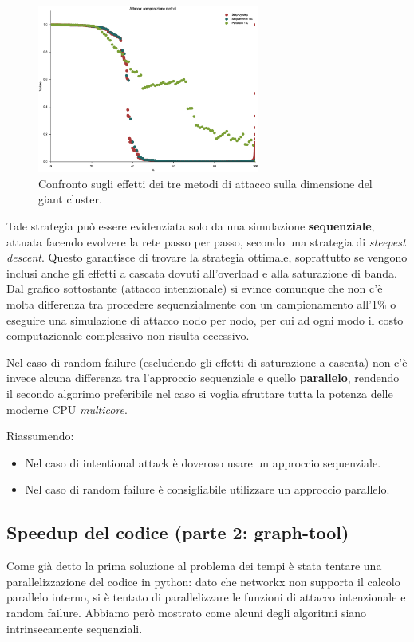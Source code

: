\begin{figure}[t!]
	\centering
	\includegraphics[width=0.65\textwidth]{./Immagini/Attack/AttackGC_Compare}
	\caption[Confronto metodi.]{Confronto sugli effetti dei tre metodi di attacco sulla dimensione del giant cluster.}
	\label{fig:compattack}
\end{figure}

Tale strategia può essere evidenziata solo da una simulazione \textbf{sequenziale}, attuata facendo evolvere la rete passo per passo, secondo una strategia di \emph{steepest descent}. Questo garantisce di trovare la strategia ottimale, soprattutto se vengono inclusi anche gli effetti a cascata dovuti all'overload e alla saturazione di banda. Dal grafico sottostante (attacco intenzionale) si evince comunque che non c'è molta differenza tra procedere sequenzialmente con un campionamento all'1\% o eseguire una simulazione di attacco nodo per nodo, per cui ad ogni modo il costo computazionale complessivo non risulta eccessivo.

Nel caso di random failure (escludendo gli effetti di saturazione a cascata) non c'è invece alcuna differenza tra l'approccio sequenziale e quello \textbf{parallelo}, rendendo il secondo algorimo preferibile nel caso si voglia sfruttare tutta la potenza delle moderne CPU \emph{multicore}.

Riassumendo: 
\begin{itemize}
 \item Nel caso di intentional attack è doveroso usare un approccio sequenziale. 
 \item Nel caso di random failure è consigliabile utilizzare un approccio parallelo.
\end{itemize}

\subsection{Speedup del codice (parte 2: graph-tool)}
Come già detto la prima soluzione al problema dei tempi è stata tentare una parallelizzazione del codice in python: dato che networkx non supporta il calcolo parallelo interno, si è tentato di parallelizzare le funzioni di attacco intenzionale e random failure. Abbiamo però mostrato come alcuni degli algoritmi siano intrinsecamente sequenziali.

